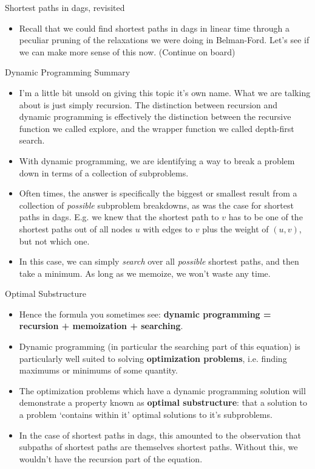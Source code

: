 \documentclass{beamer}
\begin{document}
\begin{frame}{Shortest paths in dags, revisited}
    \begin{itemize}
        \item Recall that we could find shortest paths in dags in linear time through a peculiar pruning of the relaxations we were doing in Belman-Ford. Let's see if we can make more sense of this now. (Continue on board)
    \end{itemize}
\end{frame}

\begin{frame}{Dynamic Programming Summary}
    \begin{itemize}
        \item I'm a little bit unsold on giving this topic it's own name. What we are talking about is just simply recursion. The distinction between recursion and dynamic programming is effectively the distinction between the recursive function we called explore, and the wrapper function we called depth-first search. 
        \item With dynamic programming, we are identifying a way to break a problem down in terms of a collection of subproblems. 
        \item Often times, the answer is specifically the biggest or smallest result from a collection of \emph{possible} subproblem breakdowns, as was the case for shortest paths in dags. E.g. we knew that the shortest path to $v$ has to be one of the shortest paths out of all nodes $u$ with edges to $v$ plus the weight of $(u,v)$, but not which one. 
        \item In this case, we can simply \emph{search} over all \emph{possible} shortest paths, and then take a minimum. As long as we memoize, we won't waste any time. 
    \end{itemize}
\end{frame}

\begin{frame}{Optimal Substructure}
    \begin{itemize}
        \item Hence the formula you sometimes see: \textbf{dynamic programming = recursion + memoization + searching}. 
        \item Dynamic programming (in particular the searching part of this equation) is particularly well suited to solving \textbf{optimization problems}, i.e. finding maximums or minimums of some quantity. 
        \item The optimization problems which have a dynamic programming solution will demonstrate a property known as \textbf{optimal substructure}: that a solution to a problem `contains within it' optimal solutions to it's subproblems. \pause 
        \item In the case of shortest paths in dags, this amounted to the observation that subpaths of shortest paths are themselves shortest paths. Without this, we wouldn't have the recursion part of the equation. \pause 
    \end{itemize}
\end{frame}
\end{document}

